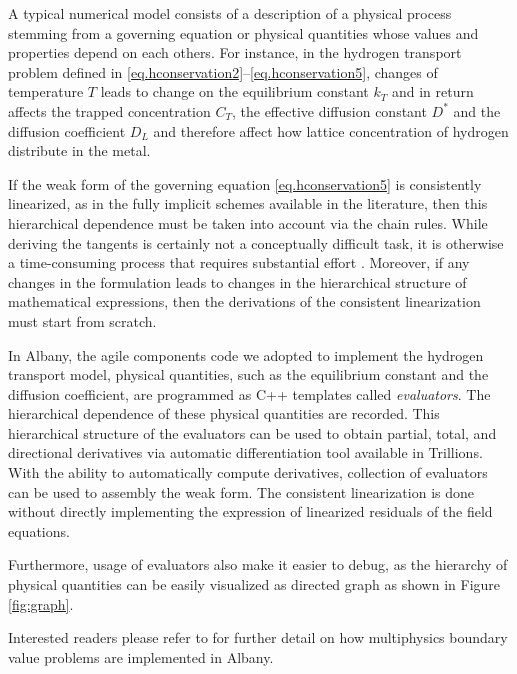 \documentclass[10pt]{elsarticle}
\begin{document}
 A typical numerical model consists of a description of a physical process
stemming from a governing equation or physical quantities whose values 
and properties depend on each others. For instance, in the hydrogen
transport problem defined in \eqref{eq.hconservation2}--\eqref{eq.hconservation5},
changes of temperature $T$ leads to change on the equilibrium constant $k_{T}$
and in return affects the trapped concentration $C_{T}$, the effective diffusion
constant $D^{*}$ and the diffusion coefficient $D_{L}$ and therefore affect how 
lattice concentration of hydrogen distribute in the metal. 

If the weak form of the governing equation \eqref{eq.hconservation5} is 
consistently linearized, as in the fully implicit schemes available 
in the literature, then this 
hierarchical dependence must be taken into account via the chain rules. 
While deriving the tangents is certainly not a conceptually difficult task, 
it is otherwise a time-consuming process that requires 
substantial effort . Moreover, if any changes in the formulation leads to changes in 
the hierarchical structure of mathematical expressions, then the derivations of the consistent linearization must
start from scratch. 

In Albany, the agile components code we adopted to implement the hydrogen
transport model,  physical quantities, such as the equilibrium constant and the
diffusion coefficient, are programmed as C++ templates called \emph{evaluators}.
The hierarchical dependence of these physical quantities are recorded. 
This hierarchical structure of the evaluators can be used to obtain partial, total,
and directional derivatives via automatic differentiation tool available in 
Trillions. With the ability to automatically compute derivatives, collection of 
evaluators can be used to assembly the weak form. The consistent linearization
is done without directly implementing the expression of linearized
residuals of the field equations. 

Furthermore, usage of evaluators also make it
easier to debug, as the hierarchy of physical quantities can be easily visualized
as directed graph as shown in Figure \ref{fig:graph}. 
\begin{figure}[h!]
\end{figure}
Interested readers please refer to \citep{Salinger:2010, Pawlowski:2012a, Pawlowski:2012b, Salinger:2013, Sun:2013}
for further detail on how multiphysics boundary value problems
are implemented in Albany. 
\end{document}
